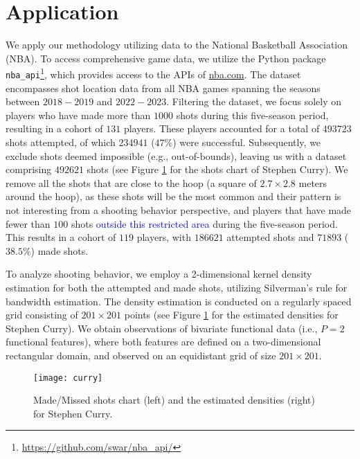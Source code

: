 
\section{Application} %
\label{sec:application}

We apply our methodology utilizing data to the National Basketball Association (NBA). To access comprehensive game data, we utilize the Python package \texttt{nba\_api}\footnote{\url{https://github.com/swar/nba_api/}}, which provides access to the APIs of \url{nba.com}. The dataset encompasses shot location data from all NBA games spanning the seasons between $2018-2019$ and $2022-2023$. Filtering the dataset, we focus solely on players who have made more than $1000$ shots during this five-season period, resulting in a cohort of $131$ players. These players accounted for a total of $493723$ shots attempted, of which $234941$ ($47\%$) were successful. Subsequently, we exclude shots deemed impossible (e.g., out-of-bounds), leaving us with a dataset comprising $492621$ shots (see Figure \ref{fig:shoots_make_miss} for the shots chart of Stephen Curry). We remove all the shots that are close to the hoop (a square of $2.7 \times 2.8$ meters around the hoop), as these shots will be the most common and their pattern is not interesting from a shooting behavior perspective, and players that have made fewer than $100$ shots \textcolor{blue}{outside this restricted area} during the five-season period. This results in a cohort of $119$ players, with $186621$ attempted shots and $71893$ ($38.5\%$) made shots.

To analyze shooting behavior, we employ a 2-dimensional kernel density estimation for both the attempted and made shots, utilizing Silverman's rule \citep{silvermanDensityEstimationStatistics1986} for bandwidth estimation. The density estimation is conducted on a regularly spaced grid consisting of $201 \times 201$ points (see Figure \ref{fig:shoots_make_miss} for the estimated densities for Stephen Curry). We obtain observations of bivariate functional data (i.e., $P = 2$ functional features), where both features are defined on a two-dimensional rectangular domain, and observed on an equidistant grid of size $201 \times 201$.
\begin{figure}
    \centering
    \texttt{[image: curry]}
    \caption{Made/Missed shots chart (left) and the estimated densities (right) for Stephen Curry.}
    \label{fig:shoots_make_miss}
\end{figure}



